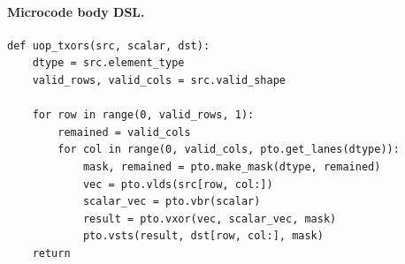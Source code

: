 \paragraph{Microcode body DSL.}
\begin{lstlisting}[style=ptocode]
def uop_txors(src, scalar, dst):
    dtype = src.element_type
    valid_rows, valid_cols = src.valid_shape

    for row in range(0, valid_rows, 1):
        remained = valid_cols
        for col in range(0, valid_cols, pto.get_lanes(dtype)):
            mask, remained = pto.make_mask(dtype, remained)
            vec = pto.vlds(src[row, col:])
            scalar_vec = pto.vbr(scalar)
            result = pto.vxor(vec, scalar_vec, mask)
            pto.vsts(result, dst[row, col:], mask)
    return
\end{lstlisting}
